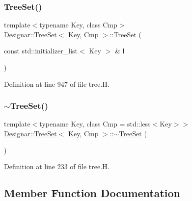 \subsubsection{\texorpdfstring{Tree\+Set()}{TreeSet()}\hspace{0.1cm}{\footnotesize\ttfamily [7/7]}}
{\footnotesize\ttfamily template$<$typename Key, class Cmp$>$ \\
\hyperlink{class_designar_1_1_tree_set}{Designar\+::\+Tree\+Set}$<$ Key, Cmp $>$\+::\hyperlink{class_designar_1_1_tree_set}{Tree\+Set} (\begin{DoxyParamCaption}\item[{const std\+::initializer\+\_\+list$<$ Key $>$ \&}]{l }\end{DoxyParamCaption})}



Definition at line 947 of file tree.\+H.

\mbox{\label{class_designar_1_1_tree_set_af1c4be1e69a6bcaab42f81668df410d5}} 
\subsubsection{\texorpdfstring{$\sim$\+Tree\+Set()}{~TreeSet()}}
{\footnotesize\ttfamily template$<$typename Key, class Cmp = std\+::less$<$\+Key$>$$>$ \\
\hyperlink{class_designar_1_1_tree_set}{Designar\+::\+Tree\+Set}$<$ Key, Cmp $>$\+::$\sim$\hyperlink{class_designar_1_1_tree_set}{Tree\+Set} (\begin{DoxyParamCaption}{ }\end{DoxyParamCaption})\hspace{0.3cm}{\ttfamily [inline]}}



Definition at line 233 of file tree.\+H.



\subsection{Member Function Documentation}
\mbox{\label{class_designar_1_1_tree_set_a81abff4df0c9baf2fbf5c96a2d72cb67}} 
